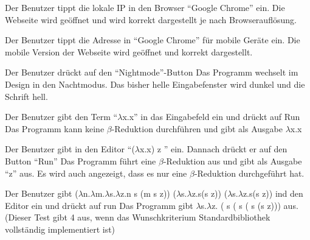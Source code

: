 \documentclass[parskip=full,11pt,twoside]{scrartcl}
\begin{document}
{Der Benutzer tippt die lokale IP in den Browser \enquote {Google Chrome} ein.}
{Die Webseite wird geöffnet und wird korrekt dargestellt je nach Browserauflösung.}

{Der Benutzer tippt die Adresse in \enquote{Google Chrome} für mobile Geräte ein.}
{Die mobile Version der Webseite wird geöffnet und korrekt dargestellt.}

{Der Benutzer drückt auf den \enquote{Nightmode}-Button}
{Das Programm wechselt im Design in den Nachtmodus. Das bisher helle Eingabefenster wird dunkel und die Schrift hell.}





{Der Benutzer gibt den Term \enquote {$\lambda$x.x} in das Eingabefeld ein und drückt auf Run}
{Das Programm kann keine $\beta$-Reduktion durchführen und gibt als Ausgabe $\lambda$x.x}

{ Der Benutzer gibt in den Editor \enquote {($\lambda$x.x) z } ein. Dannach drückt er auf den Button \enquote {Run}}
{ Das Programm führt eine $\beta$-Reduktion aus und gibt als Ausgabe \enquote {z} aus. Es wird auch angezeigt, dass es nur eine $\beta$-Reduktion durchgeführt hat.}

{Der Benutzer gibt \newline ($\lambda$n.$\lambda$m.$\lambda$s.$\lambda$z.n s (m s z)) ($\lambda$s.$\lambda$z.s(s z)) ($\lambda$s.$\lambda$z.s(s z)) ind den Editor ein und drückt auf run}
{Das Programm gibt $\lambda$s.$\lambda$z. ( s ( s ( s (s z))) aus. (Dieser Test gibt 4 aus, wenn das Wunschkriterium Standardbibliothek vollständig implementiert ist) }
\end{document}
